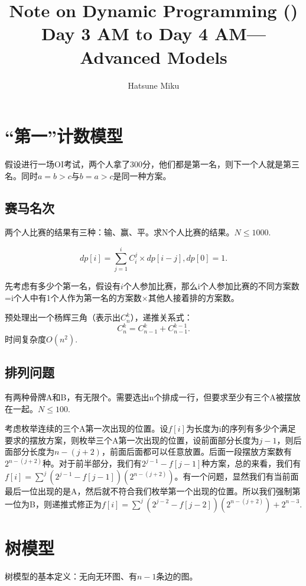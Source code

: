 \documentclass{article}
\newcommand{\romannum}[1]{\uppercase\expandafter{\romannumeral#1}}
\begin{document}
\title{Note on Dynamic Programming (\romannum{3})\\\large{Day 3 AM to Day 4 AM---Advanced Models}}\date{}\author{Hatsune Miku}
\maketitle
\tableofcontents
\newpage

\section{“第一”计数模型}
假设进行一场OI考试，两个人拿了300分，他们都是第一名，则下一个人就是第三名。同时$a=b>c$与$b=a>c$是同一种方案。
\subsection{赛马名次}
两个人比赛的结果有三种：输、赢、平。求N个人比赛的结果。$N\le 1000.$

\begin{equation*}
    dp[i]=\sum_{j=1}^i C_i^j\times dp[i-j],dp[0]=1.
\end{equation*}

先考虑有多少个第一名，假设有$i$个人参加比赛，那么i个人参加比赛的不同方案数=i个人中有1个人作为第一名的方案数$\times$其他人接着排的方案数。

预处理出一个杨辉三角（表示出$C_n^k$），递推关系式：
\begin{equation*}
    C_n^k=C_{n-1}^k+C_{n-1}^{k-1}.
\end{equation*}
时间复杂度$O(n^2)$.
\subsection{排列问题}
有两种骨牌A和B，有无限个。需要选出n个排成一行，但要求至少有三个A被摆放在一起。$N\le 100.$

考虑枚举连续的三个A第一次出现的位置。设$f[i]$为长度为i的序列有多少个满足要求的摆放方案，则枚举三个A第一次出现的位置，设前面部分长度为$j-1$，则后面部分长度为$n-(j+2)$，前面后面都可以任意放置。后面一段摆放方案数有$2^{n-(j+2)}$种。对于前半部分，我们有$2^{j-1}-f[j-1]$种方案，总的来看，我们有$f[i]=\sum^j(2^{j-1}-f[j-1])(2^{n-(j+2)})$。有一个问题，显然我们有当前面最后一位出现的是A，然后就不符合我们枚举第一个出现的位置。所以我们强制第一位为B，则递推式修正为$f[i]=\sum^j(2^{j-2}-f[j-2])(2^{n-(j+2)})+2^{n-3}$.
\section{树模型}
树模型的基本定义：无向无环图、有$n-1$条边的图。
\end{document}
